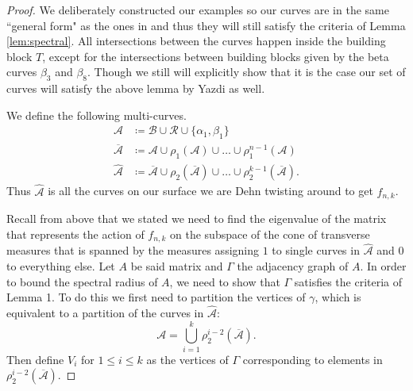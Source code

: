 \begin{proof}
  We deliberately constructed our examples so our curves are in the same ``general form" as the ones in
  \cite{yazdi2018pseudo} and thus they will still satisfy the criteria of Lemma \ref{lem:spectral}. All
  intersections between the curves happen inside the building block $T$, except for the intersections between
  building blocks given by the beta curves $\beta_3$ and $\beta_8$. Though we still will explicitly show that
  it is the case our set of curves will satisfy the above lemma by Yazdi as well.

  We define the following multi-curves.
\begin{align*}
  \mathcal{A} &\coloneqq \mathcal{B} \cup \mathcal{R} \cup \{\alpha_1,\beta_1\} \\
  \overline{\mathcal{A}} &\coloneqq \mathcal{A} \cup \rho_1(\mathcal{A}) \cup \dots \cup \rho_1^{n-1}(\mathcal{A}) \\
  \widehat{\mathcal{A}} &\coloneqq \overline{\mathcal{A}} \cup \rho_2\left(\overline{\mathcal{A}}\right) \cup \dots \cup \rho_2^{k-1}\left(\overline{\mathcal{A}}\right).
\end{align*}
Thus $\hat{\mathcal{A}}$ is all the curves on our surface we are Dehn twisting around to get $f_{n,k}$.

Recall from above that we stated we need to find the eigenvalue of the matrix that represents the action of
$f_{n,k}$ on the subspace of the cone of transverse measures that is spanned by the measures assigning $1$ to
single curves in $\hat{\mathcal{A}}$ and 0 to everything else. Let $A$ be said matrix and $\Gamma$ the
adjacency graph of $A$. In order to bound the spectral radius of $A$, we need to show that $\Gamma$ satisfies
the criteria of Lemma 1. To do this we first need to partition the vertices of $\gamma$, which is equivalent
to a partition of the curves in $\hat{\mathcal{A}}$:
$$\mathcal{A} = \bigcup_{i=1}^k \rho_2^{i-2}(\overline{\mathcal{A}}).$$ Then define $V_i$ for
$1 \leq i \leq k$ as the vertices of $\Gamma$ corresponding to elements in
$\rho_2^{i-2}(\overline{\mathcal{A}})$.


\end{proof}
